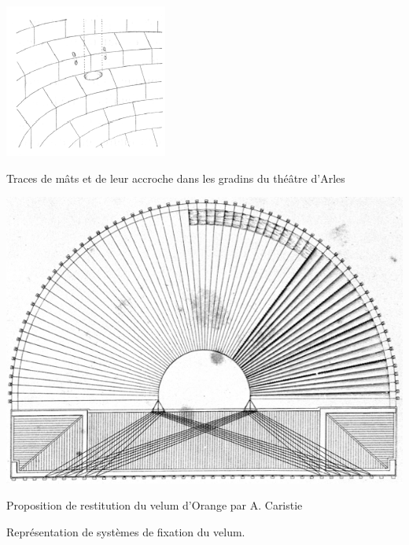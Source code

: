 		
	\begin{figureth}
		\begin{subfigureth}{0.35\textwidth}
			\includegraphics[width=\linewidth]{images/velumArles}
		\caption[Traces de mâts et de leur accroche dans les gradins du théâtre d'Arles]{Traces de mâts et de leur accroche dans les gradins du théâtre d'Arles \footnotemark}
			\label{velumArles}
		\end{subfigureth}	
		\qquad
		\begin{subfigureth}{0.55\textwidth}
			\includegraphics[width=\linewidth]{images/velumCaristie}
		\caption[Proposition de restitution du velum d'Orange par A. Caristie]{Proposition de restitution du velum d'Orange par A. Caristie \footnotemark}
		\label{velumCaristie}
		\end{subfigureth}
	\caption{Représentation de systèmes de fixation du \gls{velum}.}

	\end{figureth}
\addtocounter{footnote}{-1}
\addtocounter{footnote}{1}
				

